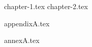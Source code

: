 \documentclass[main=portuguese,alt=english,msc,fctuc]{uc-thesis}
\begin{document}
\makefrontmatter

\mainmatter
{chapter-1.tex}
{chapter-2.tex}

\printbibliography

\appendix
{appendixA.tex}


\annex
{annexA.tex}
\end{document}

